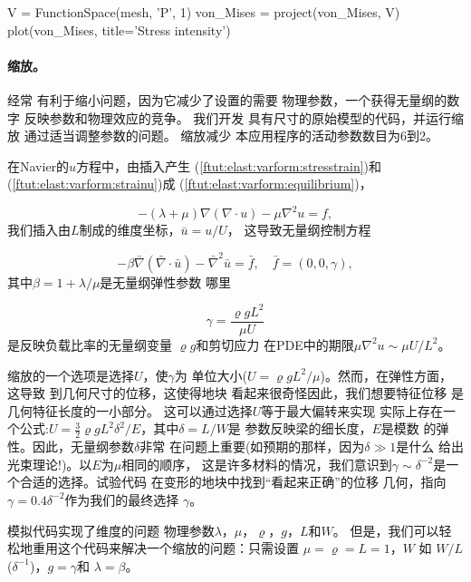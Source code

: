 \begin{python}
V = FunctionSpace(mesh, 'P', 1)
von_Mises = project(von_Mises, V)
plot(von_Mises, title='Stress intensity')
\end{python}

\paragraph{缩放。}

经常
有利于缩小问题，因为它减少了设置的需要
物理参数，一个获得无量纲的数字
反映参数和物理效应的竞争。 我们开发
具有尺寸的原始模型的代码，并运行缩放
通过适当调整参数的问题。 缩放减少
本应用程序的活动参数数目为6到2。

在Navier的$u$方程中，由插入产生
(\ref{ftut:elast:varform:stresstrain})和
(\ref{ftut:elast:varform:strainu})成
(\ref{ftut:elast:varform:equilibrium})，

\[ -(\lambda + \mu)\nabla(\nabla\cdot u) - \mu\nabla^2 u = f,\]
我们插入由$L$制成的维度坐标，$\bar u=u/U$，
这导致无量纲控制方程

\[
-\beta\bar\nabla(\bar\nabla\cdot \bar u) - \bar\nabla^2 \bar u =
\bar f,\quad \bar f = (0,0,\gamma),\]
其中$\beta = 1 + \lambda/\mu$是无量纲弹性参数
哪里

\[ \gamma = \frac{\varrho gL^2}{\mu U}\]
是反映负载比率的无量纲变量
$\varrho g$和剪切应力
在PDE中的期限$\mu\nabla^2u\sim \mu U/L^2$。

缩放的一个选项是选择$U$，使$\gamma$为
单位大小($U = \varrho gL^2/\mu$)。然而，在弹性方面，这导致
到几何尺寸的位移，这使得地块
看起来很奇怪因此，我们想要特征位移
是几何特征长度的一小部分。
这可以通过选择$U$等于最大偏转来实现
实际上存在一个公式:$U =
\frac{3}{2}\varrho gL^2\delta^2/E$，其中$\delta = L/W$是
参数反映梁的细长度，$E$是模数
的弹性。因此，无量纲参数$\delta$非常
在问题上重要(如预期的那样，因为$\delta\gg 1$是什么
  给出光束理论!)。以$E$为$\mu$相同的顺序，
这是许多材料的情况，我们意识到$\gamma \sim
\delta^{-2}$是一个合适的选择。试验代码
在变形的地块中找到“看起来正确”的位移
几何，指向$\gamma = 0.4\delta^{-2}$作为我们的最终选择
$\gamma$。

模拟代码实现了维度的问题
物理参数$\lambda$，$\mu$，$\varrho$，$g$，$L$和$W$。
但是，我们可以轻松地重用这个代码来解决一个缩放的问题：只需设置
$\mu = \varrho = L = 1$，$W$ 如 $W/L$ ($\delta^{-1}$)，$g=\gamma$和
$\lambda=\beta$。

